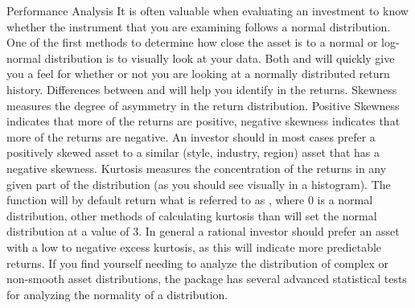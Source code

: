 \documentclass[12pt,letterpaper,english]{article}
\begin{document}
\begin{Section}{Performance Analysis}
It is often valuable when evaluating an investment to know whether the instrument that you are examining follows a normal distribution.  One of the first methods to determine how close the asset is to a normal or log-normal distribution is to visually look at your data.  Both  and  will quickly give you a feel for whether or not you are looking at a normally distributed return history.  Differences between  and  will help you identify  in the returns.  Skewness measures the degree of asymmetry in the return distribution.  Positive Skewness indicates that more of the returns are positive, negative skewness indicates that more of the returns are negative.  An investor should in most cases prefer a positively skewed asset to a similar (style, industry, region) asset that has a negative skewness. Kurtosis measures the concentration of the returns in any given part of the distribution (as you should see visually in a histogram).  The  function will by default return what is referred to as , where 0 is a normal distribution, other methods of calculating kurtosis than  will set the normal distribution at a value of 3.  In general a rational investor should prefer an asset with a low to negative excess kurtosis, as this will indicate more predictable returns.  If you find yourself needing to analyze the distribution of complex or non-smooth asset distributions, the  package has several advanced statistical tests for analyzing the normality of a distribution.


\end{Section}
\end{document}

